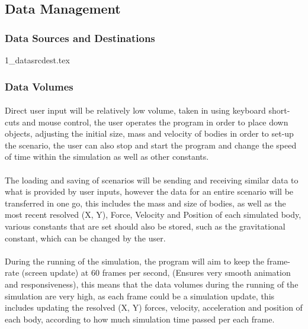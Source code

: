 \subsection{Data Management}
\subsubsection{Data Sources and Destinations}
{1_datasrcdest.tex}

\subsubsection{Data Volumes}
\paragraph{}
Direct user input will be relatively low volume, taken in using keyboard short-cuts and mouse control, the user operates the program in order to place down objects, adjusting the initial size, mass and velocity of bodies in order to set-up the scenario, the user can also stop and start the program and change the speed of time within the simulation as well as other constants.

\paragraph{}
The loading and saving of scenarios will be sending and receiving similar data to what is provided by user inputs, however the data for an entire scenario will be transferred in one go, this includes the mass and size of bodies, as well as the most recent resolved (X, Y), Force, Velocity and Position of each simulated body, various constants that are set should also be stored, such as the gravitational constant, which can be changed by the user.

\paragraph{}
During the running of the simulation, the program will aim to keep the frame-rate (screen update) at 60 frames per second, (Ensures very smooth animation and responsiveness), this means that the data volumes during the running of the simulation are very high, as each frame could be a simulation update, this includes updating the resolved (X, Y) forces, velocity, acceleration and position of each body, according to how much simulation time passed per each frame.

